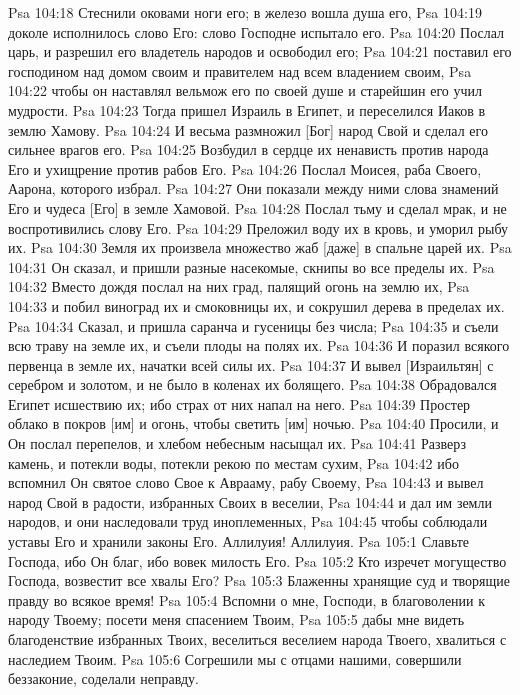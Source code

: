 Psa 104:18  Стеснили оковами ноги его; в железо вошла душа его,
Psa 104:19  доколе исполнилось слово Его: слово Господне испытало его.
Psa 104:20  Послал царь, и разрешил его владетель народов и освободил его;
Psa 104:21  поставил его господином над домом своим и правителем над всем владением своим,
Psa 104:22  чтобы он наставлял вельмож его по своей душе и старейшин его учил мудрости.
Psa 104:23  Тогда пришел Израиль в Египет, и переселился Иаков в землю Хамову.
Psa 104:24  И весьма размножил [Бог] народ Свой и сделал его сильнее врагов его.
Psa 104:25  Возбудил в сердце их ненависть против народа Его и ухищрение против рабов Его.
Psa 104:26  Послал Моисея, раба Своего, Аарона, которого избрал.
Psa 104:27  Они показали между ними слова знамений Его и чудеса [Его] в земле Хамовой.
Psa 104:28  Послал тьму и сделал мрак, и не воспротивились слову Его.
Psa 104:29  Преложил воду их в кровь, и уморил рыбу их.
Psa 104:30  Земля их произвела множество жаб [даже] в спальне царей их.
Psa 104:31  Он сказал, и пришли разные насекомые, скнипы во все пределы их.
Psa 104:32  Вместо дождя послал на них град, палящий огонь на землю их,
Psa 104:33  и побил виноград их и смоковницы их, и сокрушил дерева в пределах их.
Psa 104:34  Сказал, и пришла саранча и гусеницы без числа;
Psa 104:35  и съели всю траву на земле их, и съели плоды на полях их.
Psa 104:36  И поразил всякого первенца в земле их, начатки всей силы их.
Psa 104:37  И вывел [Израильтян] с серебром и золотом, и не было в коленах их болящего.
Psa 104:38  Обрадовался Египет исшествию их; ибо страх от них напал на него.
Psa 104:39  Простер облако в покров [им] и огонь, чтобы светить [им] ночью.
Psa 104:40  Просили, и Он послал перепелов, и хлебом небесным насыщал их.
Psa 104:41  Разверз камень, и потекли воды, потекли рекою по местам сухим,
Psa 104:42  ибо вспомнил Он святое слово Свое к Аврааму, рабу Своему,
Psa 104:43  и вывел народ Свой в радости, избранных Своих в веселии,
Psa 104:44  и дал им земли народов, и они наследовали труд иноплеменных,
Psa 104:45  чтобы соблюдали уставы Его и хранили законы Его. Аллилуия! Аллилуия.
Psa 105:1  Славьте Господа, ибо Он благ, ибо вовек милость Его.
Psa 105:2  Кто изречет могущество Господа, возвестит все хвалы Его?
Psa 105:3  Блаженны хранящие суд и творящие правду во всякое время!
Psa 105:4  Вспомни о мне, Господи, в благоволении к народу Твоему; посети меня спасением Твоим,
Psa 105:5  дабы мне видеть благоденствие избранных Твоих, веселиться веселием народа Твоего, хвалиться с наследием Твоим.
Psa 105:6  Согрешили мы с отцами нашими, совершили беззаконие, соделали неправду.
